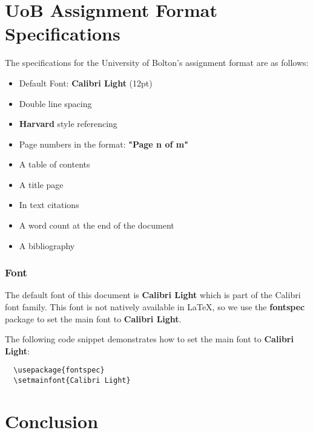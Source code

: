 \documentclass[12pt]{article}
\begin{document}

  \section{UoB Assignment Format Specifications}
  \label{sec:uob-assignment-format-specifications}

  The specifications for the University of Bolton's assignment format are as follows:

  \begin{itemize}
    \item Default Font: \textbf{Calibri Light} (12pt)
    \item Double line spacing
    \item \textbf{Harvard} style referencing
    \item Page numbers in the format: \textbf{"Page n of m"}
    \item A table of contents
    \item A title page
    \item In text citations
    \item A word count at the end of the document
    \item A bibliography
  \end{itemize}


  \subsubsection{Font}
  \label{sec:details}

  The default font of this document is \textbf{Calibri Light} which is part of the Calibri font family. 
  This font is not natively available in \LaTeX{}, so we use the \textbf{fontspec} package to set the main font to \textbf{Calibri Light}.
  

  The following code snippet demonstrates how to set the main font to \textbf{Calibri Light}:
  
  \begin{verbatim}
  \usepackage{fontspec}
  \setmainfont{Calibri Light}
  \end{verbatim}


  \section{Conclusion}
  \label{sec:conclusion}
\end{document}
